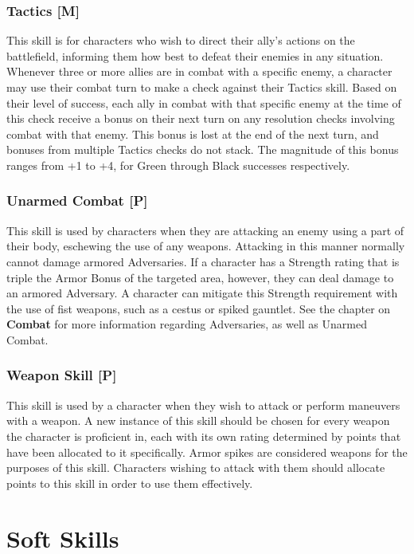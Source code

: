 \documentclass[oneside]{book}
\begin{document}
\begin{multicols}{2}
\subsubsection{Tactics [M]}
This skill is for characters who wish to direct their ally's actions on the battlefield, informing them how best to defeat their enemies in any situation. Whenever three or more allies are in combat with a specific enemy, a character may use their combat turn to make a check against their Tactics skill. Based on their level of success, each ally in combat with that specific enemy at the time of this check receive a bonus on their next turn on any resolution checks involving combat with that enemy. This bonus is lost at the end of the next turn, and bonuses from multiple Tactics checks do not stack. The magnitude of this bonus ranges from +1 to +4, for Green through Black successes respectively. 

\subsubsection{Unarmed Combat [P]}
This skill is used by characters when they are attacking an enemy using a part of their body, eschewing the use of any weapons. Attacking in this manner normally cannot damage armored Adversaries. If a character has a Strength rating that is triple the Armor Bonus of the targeted area, however, they can deal damage to an armored Adversary. A character can mitigate this Strength requirement with the use of fist weapons, such as a cestus or spiked gauntlet. See the chapter on \textbf{Combat} for more information regarding Adversaries, as well as Unarmed Combat. 

\subsubsection{Weapon Skill [P]}
This skill is used by a character when they wish to attack or perform maneuvers with a weapon. A new instance of this skill should be chosen for every weapon the character is proficient in, each with its own rating determined by points that have been allocated to it specifically. Armor spikes are considered weapons for the purposes of this skill. Characters wishing to attack with them should allocate points to this skill in order to use them effectively.

\section{Soft Skills}


\end{multicols}
\end{document}
